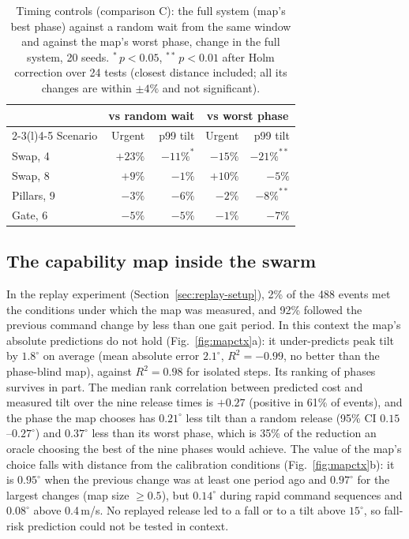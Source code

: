 \documentclass[pdflatex,sn-mathphys-num]{sn-jnl}
\begin{document}
\begin{table}[t]
  \centering
  \caption{Timing controls (comparison C): the full system (map's best phase) against a random wait from the
  same window and against the map's worst phase, change in the full system, 20 seeds. $^{*}$\,$p<0.05$,
  $^{**}$\,$p<0.01$ after Holm correction over 24 tests (closest distance included; all its changes are
  within $\pm4\%$ and not significant).}
  \label{tab:controls}
  \small
  \begin{tabular}{@{}l rr rr@{}}
    \toprule
    & \multicolumn{2}{c}{vs random wait} & \multicolumn{2}{c}{vs worst phase} \\
    \cmidrule(lr){2-3}\cmidrule(l){4-5}
    Scenario & Urgent & p99 tilt & Urgent & p99 tilt \\
    \midrule
    Swap, 4    & $+23\%$ & $-11\%^{*}$ & $-15\%$ & $-21\%^{**}$ \\
    Swap, 8    & $+9\%$   & $-1\%$       & $+10\%$ & $-5\%$ \\
    Pillars, 9 & $-3\%$   & $-6\%$       & $-2\%$  & $-8\%^{**}$ \\
    Gate, 6    & $-5\%$   & $-5\%$       & $-1\%$  & $-7\%$ \\
    \bottomrule
  \end{tabular}
\end{table}

\subsection{The capability map inside the swarm}\label{sec:map-context}
In the replay experiment (Section~\ref{sec:replay-setup}), 2\% of the 488 events met the conditions under which
the map was measured, and 92\% followed the previous command change by less than one gait period. In this
context the map's absolute predictions do not hold (Fig.~\ref{fig:mapctx}a): it under-predicts peak tilt by
$1.8^\circ$ on average (mean absolute error $2.1^\circ$, $R^2 = -0.99$, no better than the phase-blind map),
against $R^2 = 0.98$ for isolated steps. Its ranking of phases survives in part. The median rank correlation
between predicted cost and measured tilt over the nine release times is $+0.27$ (positive in 61\% of events),
and the phase the map chooses has $0.21^\circ$ less tilt than a random release (95\% CI $0.15$--$0.27^\circ$)
and $0.37^\circ$ less than its worst phase, which is 35\% of the reduction an oracle choosing the best of the
nine phases would achieve. The value of the map's choice falls with distance from the calibration conditions
(Fig.~\ref{fig:mapctx}b): it is $0.95^\circ$ when the previous change was at least one period ago and
$0.97^\circ$ for the largest changes (map size $\geq 0.5$), but $0.14^\circ$ during rapid command sequences
and $0.08^\circ$ above 0.4\,m/s. No replayed release led to a fall or to a tilt above $15^\circ$, so fall-risk
prediction could not be tested in context.
\end{document}
